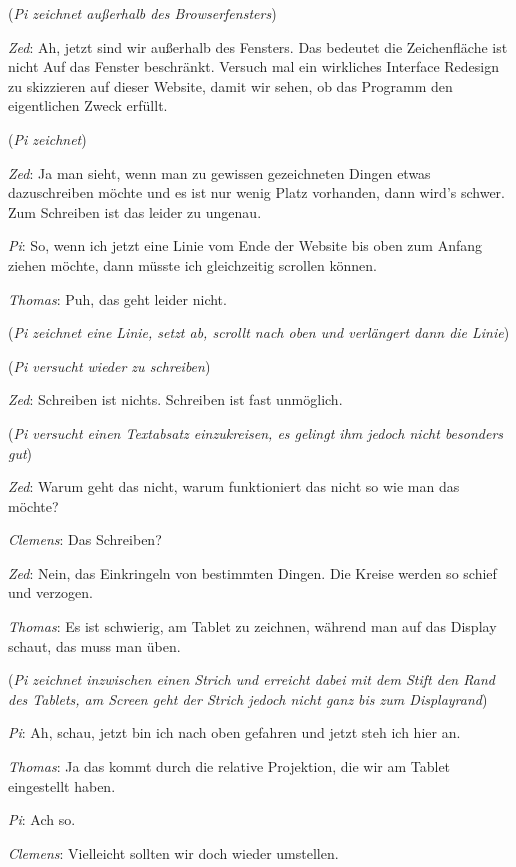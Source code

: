 \medskip (\emph{Pi zeichnet außerhalb des Browserfensters})

\medskip \emph{Zed}: Ah, jetzt sind wir außerhalb des Fensters. Das bedeutet die Zeichenfläche ist nicht Auf das Fenster beschränkt. Versuch mal ein wirkliches Interface Redesign zu skizzieren auf dieser Website, damit wir sehen, ob das Programm den eigentlichen Zweck erfüllt.

\medskip (\emph{Pi zeichnet})

\medskip \emph{Zed}: Ja man sieht, wenn man zu gewissen gezeichneten Dingen etwas dazuschreiben möchte und es ist nur wenig Platz vorhanden, dann wird's schwer. Zum Schreiben ist das leider zu ungenau.

\medskip \emph{Pi}: So, wenn ich jetzt eine Linie vom Ende der Website bis oben zum Anfang ziehen möchte, dann müsste ich gleichzeitig scrollen können.

\medskip \emph{Thomas}: Puh, das geht leider nicht.

\medskip (\emph{Pi zeichnet eine Linie, setzt ab, scrollt nach oben und verlängert dann die Linie})

\medskip (\emph{Pi versucht wieder zu schreiben})

\medskip \emph{Zed}: Schreiben ist nichts. Schreiben ist fast unmöglich.

\medskip (\emph{Pi versucht einen Textabsatz einzukreisen, es gelingt ihm jedoch nicht besonders gut})

\medskip \emph{Zed}: Warum geht das nicht, warum funktioniert das nicht so wie man das möchte?

\medskip \emph{Clemens}: Das Schreiben?

\medskip \emph{Zed}: Nein, das Einkringeln von bestimmten Dingen. Die Kreise werden so schief und verzogen.

\medskip \emph{Thomas}: Es ist schwierig, am Tablet zu zeichnen, während man auf das Display schaut, das muss man üben.

\medskip (\emph{Pi zeichnet inzwischen einen Strich und erreicht dabei mit dem Stift den Rand des Tablets, am Screen geht der Strich jedoch nicht ganz bis zum Displayrand})

\medskip \emph{Pi}: Ah, schau, jetzt bin ich nach oben gefahren und jetzt steh ich hier an.

\medskip \emph{Thomas}: Ja das kommt durch die relative Projektion, die wir am Tablet eingestellt haben.

\medskip \emph{Pi}: Ach so.

\medskip \emph{Clemens}: Vielleicht sollten wir doch wieder umstellen.

